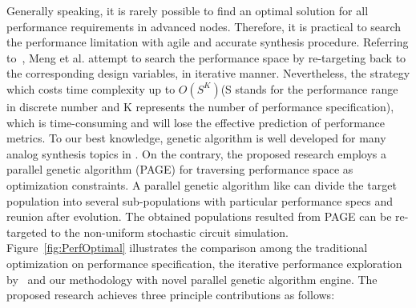       Generally speaking, it is rarely possible to find an optimal solution for all performance requirements in advanced nodes. Therefore, it is practical to search the performance limitation with agile and accurate synthesis procedure. Referring to~\cite{PerfMap_ISQED2011}, Meng et al. attempt to search the performance space by re-targeting back to the corresponding design variables, in iterative manner. Nevertheless, the strategy which costs time complexity up to $O(S^K)$(S stands for the performance range in discrete number and K represents the number of performance specification), which is time-consuming and will lose the effective prediction of performance metrics. To our best knowledge, genetic algorithm is well developed for many analog synthesis topics in \cite{DARWIN_DAC1995,CAFFEINE_DATE2005,HeteroSyn_DATE2006,NominalYieldArea_AHS2009}. On the contrary, the proposed research employs a parallel genetic algorithm (PAGE) for traversing performance space as optimization constraints. A parallel genetic algorithm like \cite{SurveyPGA1997,SurveyDistPGA1997} can divide the target population into several sub-populations with particular performance specs and reunion after evolution. The obtained populations resulted from PAGE can be re-targeted to the non-uniform stochastic circuit simulation. Figure~\ref{fig:PerfOptimal} illustrates the comparison among the traditional optimization on performance specification, the iterative performance exploration by~\cite{PerfMap_ISQED2011} and our methodology with novel parallel genetic algorithm engine. The proposed research achieves three principle contributions as follows: 
